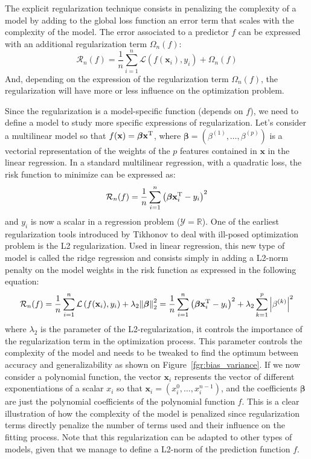 \documentclass[main]{subfiles}
\begin{document}
The explicit regularization technique consists in penalizing the complexity of a model by adding to the global loss function an error term that scales with the complexity of the model. The error associated to a predictor $f$ can be expressed with an additional regularization term ${\Omega}_n(f)$:
\begin{equation}
  \mathcal{R}_n(f) = \frac{1}{n}\sum_{i=1}^n \mathcal{L}\left(f(\mathbf{x}_i),y_i\right) + \Omega_n(f)
\end{equation}
And, depending on the expression of the regularization term ${\Omega}_n(f)$, the regularization will have more or less influence on the optimization problem. 

Since the regularization is a model-specific function (depends on $f$), we need to define a model to study more specific expressions of regularization. 
Let's consider a multilinear model so that $f(\mathbf{x}) = \boldsymbol{\beta}\mathbf{x}^{\text{T}}$, where $\boldsymbol{\beta}=(\beta^{(1)},\ldots,\beta^{(p)})$ is a vectorial representation of the weights of the $p$ features contained in $\mathbf{x}$ in the linear regression. In a standard multilinear regression, with a quadratic loss, the risk function to minimize can be expressed as:
\begin{equation}\label{eq:linear}
  \mathcal{R}_n(f) = \frac{1}{n}\sum_{i=1}^n {\left(\boldsymbol{\beta}\mathbf{x}_i^{\text{T}}-y_i\right)}^2 
\end{equation}
and $y_i$ is now a scalar in a regression problem ($\mathcal{Y}=\mathbb{R}$). One of the earliest regularization tools introduced by Tikhonov to deal with ill-posed optimization problem is the L2 regularization. Used in linear regression, this new type of model is called the ridge regression and consists simply in adding a L2-norm penalty on the model weights in the risk function as expressed in the following equation:
\begin{equation}\label{eq:L2_reg}
  \mathcal{R}_n(f) = \frac{1}{n}\sum_{i=1}^n \mathcal{L}\left(f(\mathbf{x}_i),y_i\right) + \lambda_2 {\lVert \boldsymbol{\beta} \rVert}_2^2 = \frac{1}{n}\sum_{i=1}^n {\left(\boldsymbol{\beta}\mathbf{x}_i^{\text{T}}-y_i\right)}^2 + \lambda_2 \sum_{k=1}^p \left|\beta^{(k)}\right|^2
\end{equation}
where $\lambda_2$ is the parameter of the L2-regularization, it controls the importance of the regularization term in the optimization process. This parameter controls the complexity of the model and needs to be tweaked to find the optimum between accuracy and generalizability as shown on Figure~\ref{fgr:bias_variance}. If we now consider a polynomial function, the vector $\mathbf{x}_i$ represents the vector of different exponentiations of a scalar $x_i$ so that $\mathbf{x}_i=\left(x_i^0,\ldots,x_i^{n-1}\right)$, and the coefficients $\boldsymbol{\beta}$ are just the polynomial coefficients of the polynomial function $f$. This is a clear illustration of how the complexity of the model is penalized since regularization terms directly penalize the number of terms used and their influence on the fitting process.
Note that this regularization can be adapted to other types of models, given that we manage to define a L2-norm of the prediction function $f$.
\end{document}
